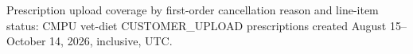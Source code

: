 Prescription upload coverage by first-order cancellation reason and line-item status: CMPU vet-diet CUSTOMER\_UPLOAD prescriptions created August 15--October 14, 2026, inclusive, UTC.
